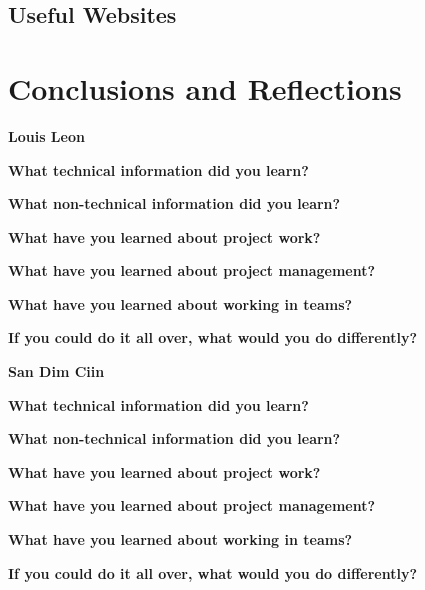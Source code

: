 \documentclass[onecolumn, draftclsnofoot,10pt, compsoc]{IEEEtran}
\begin{document}
\subsection{Useful Websites}

\section{Conclusions and Reflections}
\begin{flushleft}
{\large\textbf{Louis Leon}\par}
\textbf{What technical information did you learn?}\par

\textbf{What non-technical information did you learn?}\par

\textbf{What have you learned about project work?}\par

\textbf{What have you learned about project management?}\par

\textbf{What have you learned about working in teams?}\par

\textbf{If you could do it all over, what would you do differently?}\par

\end{flushleft}

\begin{flushleft}
{\large\textbf{San Dim Ciin}\par}
\textbf{What technical information did you learn?}\par

\textbf{What non-technical information did you learn?}\par

\textbf{What have you learned about project work?}\par

\textbf{What have you learned about project management?}\par

\textbf{What have you learned about working in teams?}\par

\textbf{If you could do it all over, what would you do differently?}\par

\end{flushleft}
\end{document}
